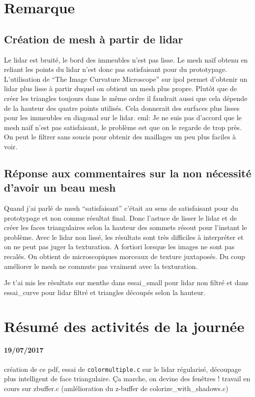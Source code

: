 \documentclass{article}
\newcommand{\mnhrdt}[1]{{\footnotesize\textcolor[rgb]{0.8,0.5,0.5}{eml: #1}}}
\begin{document}
\section{Remarque}
\subsection{Création de mesh à partir de lidar}
Le lidar est bruité, le bord des immeubles n'est pas lisse. Le mesh naïf
obtenu en reliant les points du lidar n'est donc pas satisfaisant pour du prototypage.
L'utilisation de ``The Image Curvature Microscope'' sur ipol permet d'obtenir
un lidar plus lisse à partir duquel on obtient un mesh plus propre. Plutôt
que de créer les triangles toujours dans le même ordre il faudrait aussi que
cela dépende de la hauteur des quatre points utilisés. Cela donnerait des
surfaces plus lisses pour les immeubles en diagonal sur le lidar.
\mnhrdt{Je ne suis pas d'accord que le mesh naïf n'est pas satisfaisant, le
problème est que on le regarde de trop près.  On peut le filtrer sans soucis
pour obtenir des maillages un peu plus faciles à voir. }

\subsection{R\'eponse aux commentaires sur la non n\'ecessit\'e d'avoir un beau mesh}
Quand j'ai parl\'e de mesh ``satisfaisant'' c'\'etait au sens de satisfaisant pour du prototypage et non comme r\'esultat final. Donc l'astuce de lisser le lidar et de cr\'eer les faces triangulaires selon la hauteur des sommets r\'esout pour l'instant le probl\`eme. Avec le lidar non liss\'e, les r\'esultats sont tr\`es difficiles \`a interpr\'eter et on ne peut pas juger la texturation. A fortiori lorsque les images ne sont pas recal\'es. On obtient de microscopiques morceaux de texture juxtapos\'es. Du coup am\'eliorer le mesh ne commute pas vraiment avec la texturation.

Je t'ai mis les r\'esultats sur menthe dans essai\_small pour lidar non filtr\'e et dans essai\_curve pour lidar filtr\'e et triangles d\'ecoup\'es selon la hauteur. 


\section{Résumé des activités de la journée}
\paragraph{19/07/2017} création de ce pdf, essai de \verb"colormultiple.c" sur le lidar régularisé, d\'ecoupage plus intelligent de face triangulaire. \c Ca marche, on devine des fen\^etres ! travail en cours sur zbuffer.c (aml\'elioration du z-buffer de colorize\_with\_shadows.c)
\end{document}
